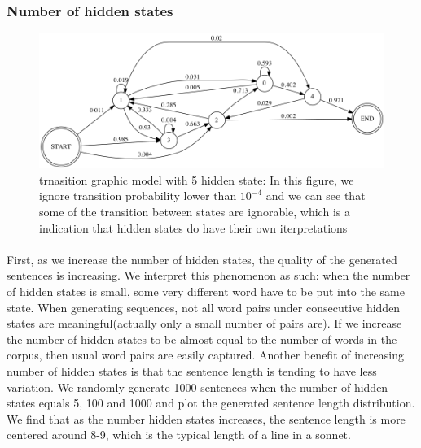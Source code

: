 %
\vspace{5pt}
\subsubsection{Number of hidden states}
\vspace{5pt}
\begin{figure}[h!]
 \centering
 \includegraphics[width=1\textwidth]{./figure/HiddenMarkov5.png}
 \caption{trnasition graphic model with 5 hidden state: In this figure, we ignore transition probability lower than $10 ^{-4}$ and we can see that some of the transition between states are ignorable, which is a indication that hidden states do have their own iterpretations}
 \end{figure}
\paragraph{} First, as we increase the number of hidden states, the quality of the generated sentences is increasing. We interpret this phenomenon as such: when the number of hidden states is small, some very different word have to be put into the same state. When generating sequences, not all word pairs under consecutive hidden states are meaningful(actually only a small number of pairs are). If we increase the number of hidden states to be almost equal to the number of words in the corpus, then usual word pairs are easily captured. Another benefit of increasing number of hidden states is that the sentence length is tending to have less variation. We randomly generate 1000 sentences when the number of hidden states equals 5, 100 and 1000 and plot the generated sentence length distribution. We find that as the number hidden states increases, the sentence length is more centered around 8-9, which is the typical length of a line in a sonnet.

